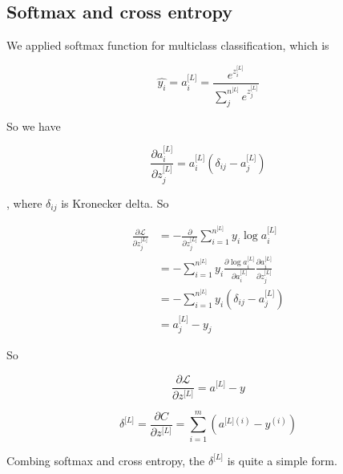 \documentclass[11pt]{scrartcl} %
\begin{document}
\subsection{Softmax and cross entropy}

We applied softmax function for multiclass classification, which is 

\begin{equation}
\widehat{y_i}=a_i^{\lbrack L\rbrack}=\frac{e^{z_i^{\lbrack L\rbrack}}}{{\displaystyle\sum_j^{n^{\lbrack L\rbrack}}}e^{z_j^{\lbrack L\rbrack}}}
\end{equation}

So we have 

\begin{equation}
\frac{\partial a_i^{\lbrack L\rbrack}}{\partial z_j^{\lbrack L\rbrack}}=a_i^{\lbrack L\rbrack}(\delta_{ij}-a_j^{\lbrack L\rbrack})
\end{equation}

, where $\delta_{ij}$ is Kronecker delta. So

\begin{equation}
\begin{split}
\frac{\partial\mathcal L}{\partial z_j^{\lbrack L\rbrack}}&=-\frac\partial{\partial z_j^{\lbrack L\rbrack}}\sum_{i=1}^{n^{\lbrack L\rbrack}}y_i\log a_i^{\lbrack L\rbrack} \\
&=-\sum_{i=1}^{n^{\lbrack L\rbrack}}y_i\frac{\partial{\log a_i^{\lbrack L\rbrack}}}{\partial {a_i^{\lbrack L\rbrack}}}\frac{\partial {a_i^{\lbrack L\rbrack}}}{\partial {z_j^{\lbrack L\rbrack}}} \\
&=-\sum_{i=1}^{n^{\lbrack L\rbrack}}y_i(\delta_{ij}-a_j^{\lbrack L\rbrack}) \\
&=a_j^{\lbrack L\rbrack}-y_j
\end{split}
\end{equation}

So 

\begin{equation}
\frac{\partial\mathcal L}{\partial z^{\lbrack L\rbrack}}=a^{\lbrack L\rbrack}-y
\end{equation}

\begin{equation}
\delta^{\lbrack L\rbrack}=\frac{\partial C}{\partial z^{\lbrack L\rbrack}}=\sum_{i=1}^{m}(a^{\lbrack L\rbrack (i)}-y^{(i)})
\end{equation}

Combing softmax and cross entropy, the $\delta^{\lbrack L\rbrack}$ is quite a simple form.
\end{document}
